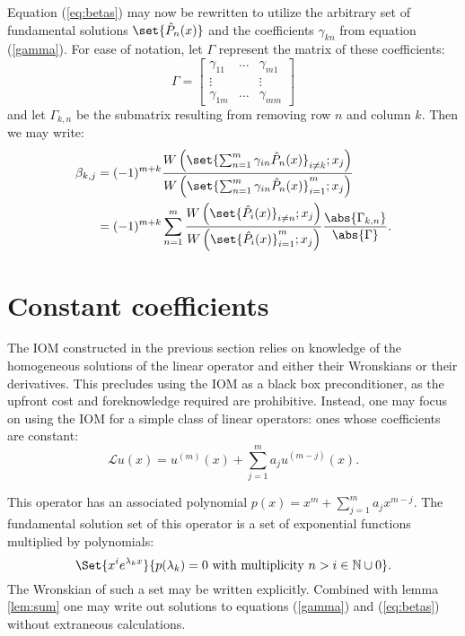 \documentclass{article}
\begin{document}
Equation (\ref{eq:betas}) may now be rewritten to utilize the arbitrary set of fundamental solutions $\set{\hat{P}_n(x)}$ and the coefficients $\gamma_{kn}$ from equation (\ref{gamma}).
For ease of notation, let $\Gamma$ represent the matrix of these coefficients:
\begin{equation*}
\Gamma = \begin{bmatrix} \gamma_{11} & \dots & \gamma_{m1} \\ \vdots & & \vdots \\ \gamma_{1m} & \dots & \gamma_{mm} \end{bmatrix}
\end{equation*}
and let $\Gamma_{k,n}$ be the submatrix resulting from removing row $n$ and column $k$.
Then we may write:
\begin{equation*}
\begin{split}
\beta_{k,j} & = (-1)^{m+k} \frac{\W{\set{\sum_{n=1}^m \gamma_{in} \hat{P}_n(x)}_{i \neq k}}{x_j}}{\W{\set{\sum_{n=1}^m \gamma_{in} \hat{P}_n(x)}_{i=1}^m}{x_j}} \\
			& = (-1)^{m+k} \sum_{n=1}^m \frac{\W{\set{\hat{P}_i(x)}_{i \neq n}}{x_j}}{\W{\set{\hat{P}_i(x)}_{i=1}^m}{x_j}} \frac{\abs{\Gamma_{k,n}}}{\abs{\Gamma}} .
\end{split}
\end{equation*}

\section{Constant coefficients}

The IOM constructed in the previous section relies on knowledge of the homogeneous solutions of the linear operator and either their Wronskians or their derivatives.
This precludes using the IOM as a black box preconditioner, as the upfront cost and foreknowledge required are prohibitive.
Instead, one may focus on using the IOM for a simple class of linear operators: ones whose coefficients are constant:
\begin{equation*}
\mathcal{L}u(x) = u^{(m)}(x) + \sum_{j=1}^{m} a_j u^{(m-j)}(x) .
\end{equation*}

This operator has an associated polynomial $p(x) = x^m + \sum_{j=1}^{m} a_j x^{m-j}$.
The fundamental solution set of this operator is a set of exponential functions multiplied by polynomials:
\begin{equation*}
\Set{x^{i} e^{\lambda_k x}}{p(\lambda_k) = 0 \ \text{with multiplicity } n>i \in \mathbb{N} \cup 0} .
\end{equation*}
The Wronskian of such a set may be written explicitly.
Combined with lemma \ref{lem:sum} one may write out solutions to equations (\ref{gamma}) and (\ref{eq:betas}) without extraneous calculations.
\end{document}
